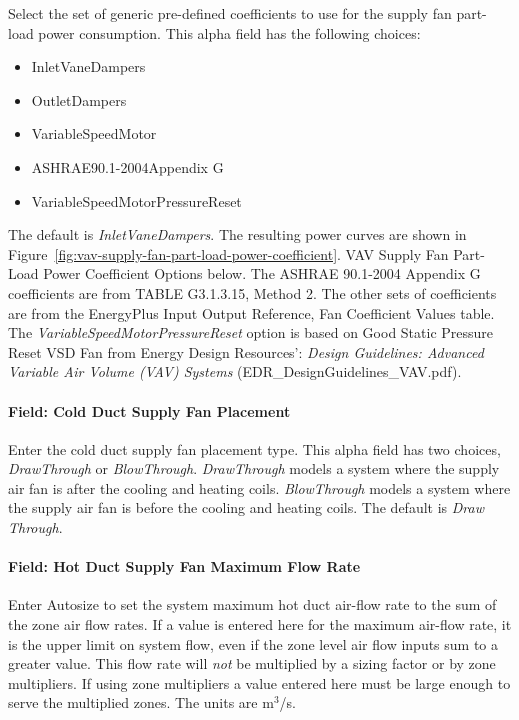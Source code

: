 Select the set of generic pre-defined coefficients to use for the supply fan part-load power consumption. This alpha field has the following choices:

\begin{itemize}
\item
  InletVaneDampers
\item
  OutletDampers
\item
  VariableSpeedMotor
\item
  ASHRAE90.1-2004Appendix G
\item
  VariableSpeedMotorPressureReset
\end{itemize}

The default is \emph{InletVaneDampers}. The resulting power curves are shown in Figure~\ref{fig:vav-supply-fan-part-load-power-coefficient}. VAV Supply Fan Part-Load Power Coefficient Options below. The ASHRAE 90.1-2004 Appendix G coefficients are from TABLE G3.1.3.15, Method 2. The other sets of coefficients are from the EnergyPlus Input Output Reference, Fan Coefficient Values table. The \emph{VariableSpeedMotorPressureReset} option is based on Good Static Pressure Reset VSD Fan from Energy Design Resources': \emph{Design Guidelines: Advanced Variable Air Volume (VAV) Systems} (EDR\_DesignGuidelines\_VAV.pdf).

\paragraph{Field: Cold Duct Supply Fan Placement}\label{field-cold-duct-supply-fan-placement}

Enter the cold duct supply fan placement type. This alpha field has two choices, \emph{DrawThrough} or \emph{BlowThrough}. \emph{DrawThrough} models a system where the supply air fan is after the cooling and heating coils. \emph{BlowThrough} models a system where the supply air fan is before the cooling and heating coils. The default is \emph{Draw Through}.

\paragraph{Field: Hot Duct Supply Fan Maximum Flow Rate}\label{field-hot-duct-supply-fan-maximum-flow-rate}

Enter Autosize to set the system maximum hot duct air-flow rate to the sum of the zone air flow rates. If a value is entered here for the maximum air-flow rate, it is the upper limit on system flow, even if the zone level air flow inputs sum to a greater value. This flow rate will \emph{not} be multiplied by a sizing factor or by zone multipliers. If using zone multipliers a value entered here must be large enough to serve the multiplied zones. The units are m\(^{3}\)/s.

